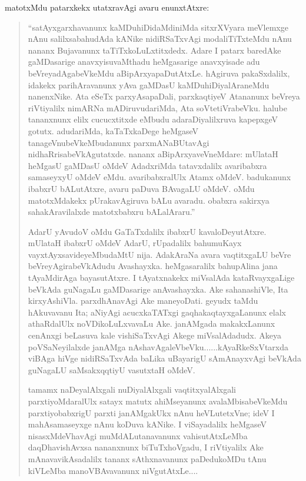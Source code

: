 matotxMdu patarxkekx utatxravAgi avaru enunxtAtxre:
\begin{quote}
``satAyxgarxhavanunx kaMDuhiDidaMdiniMda sitxrXVyara meVlemxge nAnu salilxsa\-bahudAda kANike nidiRSaTxvAgi modaliTiTxteMdu nAnu nananx Buja\-vanunx taTiTxkoLuLxtitxdedx. Adare I patarx baredAke gaMDasarige anavxyisuvaMthadu heMgasarige anavxyisade adu beVreyadAgabeVkeMdu aBipArxyapaDu\-tAtxLe. hAgiruva pakaSxdalilx, idakekx parihAravanunx yAva gaMDasU kaMDu\-hiDiyalAraneMdu nanenxNike. Ata eSeTx parxyAsa\-paDali, parxkaqtiyeV Ata\-nanunx beVreya riVtiyalilx nimARNa mADiruvudariMda, Ata soVte\-tiVrabeVku. halube tananxnunx elilx cucucxtitxde eMbudu adaraDiyalilxruva kapepxgeV gotutx. adudariMda, kaTaTxkaDege heMgaseV tanageVnubeVkeMbu\-danunx parxmANaBUtavAgi nidhaRrisabeVkAgutatxde. nananx aBipArxya\-veV\-neMdare: mUlataH heMgasU gaMDasU oMdeV AdadxriMda tatavxdalilx ava\-ribabxra samaseyxyU oMdeV eMdu. avaribabxralUlx Atamx oMdeV. badu\-kanunx ibabxrU bALutAtxre, avaru paDuva BAvagaLU oMdeV. \hbox{oMdu} matotxM\-dakekx pUrakavAgiruva bALu avaradu. obabxra sakirxya sahakAra\-vilalxde matotxbabxru bALalAraru.''

AdarU yAvudoV oMdu GaTaTxdalilx ibabxrU kavaloDeyutAtxre. mUlataH ibabxrU oMdeV AdarU, rUpadalilx bahumuKayx vayxtAyxsa\-videyeMbudaMtU nija. AdakAraNa avara vaqtitxgaLU beVre beVre\-yAgirabeVkAdudu Avashayxka. heMgasaralilx bahupAlina jana tAyaMdi\-rAga bayasutAtxre. I tAyatxnakekx miVsalAda kataRvayxgaLige beVkAda guNagaLu gaMDasarige anAvashayxka. Ake sahanashiVle, Ita kirxyAshiVla. parxdhAnavAgi Ake maneyoDati. geyudx taMdu hAkuvavanu Ita; aNiyAgi acucxkaTATxgi gaqhakaqtayxgaLanunx elalx athaRdalUlx noVDikoLuLxvavaLu Ake. janAMgada makakxLanunx cenAnxgi beLasuva kale vishiSaTxvAgi Akege miVsalAdadudx. Akeya poVSaNeyilalxde janAMga nAshavAgaleVbeVku......kAyaRkeSxVtarxda viBAga hiVge nidiRSaTxvAda baLika uBayarigU sAmAnayxvAgi beVkAda guNagaLU saMsakxqqtiyU vasutxtaH oMdeV.

tamamx naDeyalAlxgali nuDiyalAlxgali vaqtitxyalAlxgali parxtiyoMda\-ralUlx satayx matutx ahiMseyanunx avalaMbisabeVkeMdu parxtiyobabxrigU parxti janAMgakUkx nAnu heVLutetxVne; ideV I mahAsamaseyxge nAnu \hbox{koDuva} kANike. I viSayadalilx heMgaseV nisasxMdeVhavAgi muMdALutana\-vanunx vahisutAtxLeMba daqDhavishAvxsa nananxnunx biTuTx\-hoVgadu, I riVtiyalilx Ake mAnavavikAsadalilx tananx sAthxnavanunx paDedukoMDu tAnu kiVLeMba manoVBAvavanunx niVgutAtxLe....


\end{quote}
